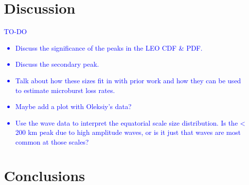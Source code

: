 \documentclass[draft]{agujournal2019}
\begin{document}
\section{Discussion}
\textcolor{blue}{
TO-DO
\begin{itemize}
\item Discuss the significance of the peaks in the LEO CDF \& PDF.
\item Discuss the secondary peak.
\item Talk about how these sizes fit in with prior work and how they can be used to estimate microburst loss rates.
\item Maybe add a plot with Oleksiy's data?
\item Use the wave data to interpret the equatorial scale size distribution. Is the < 200 km peak due to high amplitude waves, or is it just that waves are most common at those scales?
\end{itemize}
}

\section{Conclusions}


\end{document}
